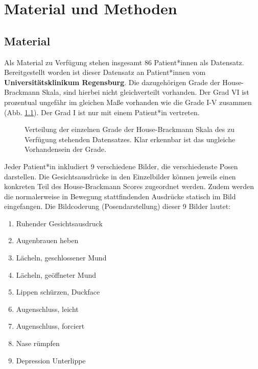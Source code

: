 
\chapter{Material und Methoden}\label{mat_and_method}


\section{Material}\label{material}
Als Material zu Verfügung stehen insgesamt 86 Patient*innen als Datensatz. Bereitgestellt worden ist dieser Datensatz an Patient*innen vom \textbf{Universitätsklinikum Regensburg}. Die dazugehörigen Grade der House-Brackmann Skala, sind hierbei nicht gleichverteilt vorhanden. Der Grad VI ist prozentual ungefähr im gleichen Maße vorhanden wie die Grade I-V zusammen (Abb. \ref{cap:pie_grade}). Der Grad I ist nur mit einem Patient*in vertreten.

\begin{figure}[!b]\centering
{}
\caption[Verteilung der einzelnen Grade der House-Brackmann Skala]{Verteilung der einzelnen Grade der House-Brackmann Skala des zu Verfügung stehenden Datensatzes. Klar erkennbar ist das ungleiche Vorhandensein der Grade.}\label{cap:pie_grade}
\end{figure}\label{fig:pie_grade}


 Jeder Patient*in inkludiert 9 verschiedene Bilder, die verschiedenste Posen darstellen. Die Gesichtsausdrücke in den Einzelbilder können jeweils einen konkreten Teil des House-Brackmann Scores zugeordnet werden. Zudem werden die normalerweise in Bewegung stattfindenden Ausdrücke statisch im Bild eingefangen. Die Bildcoderung (Posendarstellung) dieser 9 Bilder lautet:

\begin{enumerate}
  \setlength\itemsep{-0.6em}
\item Ruhender Gesichtsausdruck
\item Augenbrauen heben
\item Lächeln, geschlossener Mund
\item Lächeln, geöffneter Mund
\item Lippen schürzen, \glqq Duckface\grqq{}
\item Augenschluss, leicht
\item Augenschluss, forciert
\item Nase rümpfen
\item Depression Unterlippe
\end{enumerate}

